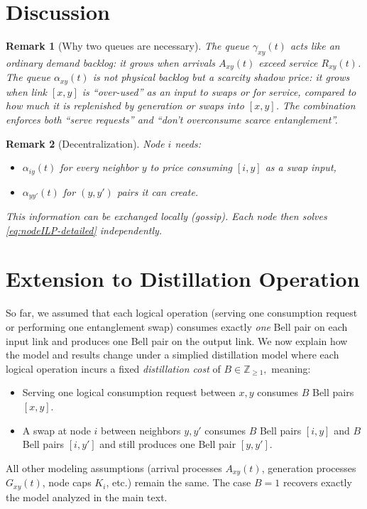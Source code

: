 \documentclass[11pt]{article}
\newtheorem{remark}{Remark}
\begin{document}
\section*{Discussion}

\begin{remark}[Why two queues are necessary]
The queue $\gamma_{xy}(t)$ acts like an ordinary demand backlog: it grows when arrivals $A_{xy}(t)$ exceed service $R_{xy}(t)$. The queue $\alpha_{xy}(t)$ is \emph{not} physical backlog but a scarcity shadow price: it grows when link $[x,y]$ is ``over-used'' as an input to swaps or for service, compared to how much it is replenished by generation or swaps \emph{into} $[x,y]$. The combination enforces both ``serve requests'' and ``don't overconsume scarce entanglement''.
\end{remark}

\begin{remark}[Decentralization]
Node $i$ needs:
\begin{itemize}[leftmargin=2em]
\item $\alpha_{iy}(t)$ for every neighbor $y$ to price consuming $[i,y]$ as a swap input,
\item $\alpha_{yy'}(t)$ for $(y,y')$ pairs it can create.
\end{itemize}
This information can be exchanged locally (gossip). Each node then solves \eqref{eq:nodeILP-detailed} independently.
\end{remark}

\section{Extension to Distillation Operation}
\label{sec:distillation-extension}

So far, we assumed that each logical operation
(serving one consumption request or performing one entanglement swap)
consumes exactly \emph{one} Bell pair on each input link and produces
one Bell pair on the output link. We now explain how the model and
results change under a simplied distillation model where each logical operation incurs a fixed
\emph{distillation cost} of
$B \in \mathbb{Z}_{\ge 1},$
meaning:
\begin{itemize}[leftmargin=2em]
\item Serving one logical consumption request between $x,y$ consumes
$B$ Bell pairs $[x,y]$.
\item A swap at node $i$ between neighbors $y,y'$ consumes $B$ Bell
pairs $[i,y]$ and $B$ Bell pairs $[i,y']$ and still produces one Bell
pair $[y,y']$.
\end{itemize}
All other modeling assumptions (arrival processes $A_{xy}(t)$,
generation processes $G_{xy}(t)$, node caps $K_i$, etc.) remain the
same. The case $B=1$ recovers exactly the model analyzed in the main
text.
\end{document}
